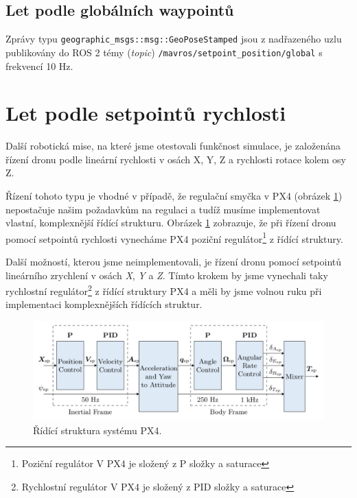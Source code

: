 \subsection{Let podle globálních waypointů}

Zprávy typu \texttt{geographic\_msgs::msg::GeoPoseStamped} jsou z nadřazeného uzlu publikovány do ROS 2 témy (\textit{topic}) \texttt{/mavros/setpoint\_position/global} s frekvencí 10 Hz.

\section{Let podle setpointů rychlosti}

Další robotická mise, na které jsme otestovali funkčnost simulace, je založená\break na řízení dronu podle lineární rychlosti v osách X, Y, Z a rychlosti rotace kolem osy Z. 

Řízení tohoto typu je vhodné v případě, že regulační smyčka v PX4 (obrázek \ref{fig:PX4controller}) nepostačuje našim požadavkům na regulaci a tudíž musíme implementovat vlastní, komplexnější řídící strukturu. Obrázek \ref{fig:PX4controller} zobrazuje, že při řízení dronu pomocí setpointů rychlosti vynecháme PX4 poziční regulátor\footnote{Poziční regulátor V PX4 je složený z P složky a saturace} z řídící struktury.

Další možností, kterou jsme neimplementovali, je řízení dronu pomocí setpointů lineárního zrychlení v osách \textit{X}, \textit{Y} a \textit{Z}. Tímto krokem by jsme vynechali taky rychlostní regulátor\footnote{Rychlostní regulátor V PX4 je složený z PID složky a saturace} z řídící struktury PX4 a měli by jsme volnou ruku při implementaci komplexnějších řídících struktur.

\begin{figure}[!ht]
  \begin{center}
    \includegraphics[scale=0.44]{obrazky/PX4CONTROLLER}
  \end{center}
  \caption[Řídící struktura systému PX4]{Řídící struktura systému PX4. \cite{PX4docs}}
  \label{fig:PX4controller}
\end{figure}

